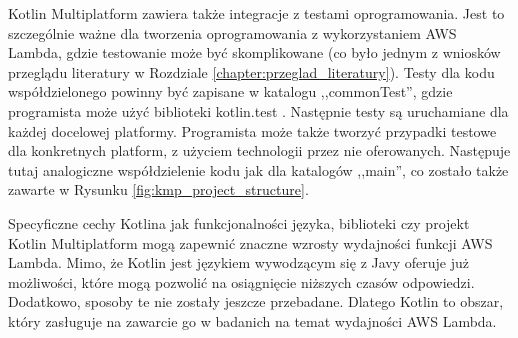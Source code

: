 Kotlin Multiplatform zawiera także integracje z testami oprogramowania.
Jest to szczególnie ważne dla tworzenia oprogramowania z wykorzystaniem AWS Lambda, gdzie testowanie może być skomplikowane (co było jednym z wniosków przeglądu literatury w Rozdziale \ref{chapter:przeglad_literatury}).
Testy dla kodu współdzielonego powinny być zapisane w katalogu ,,commonTest'', gdzie programista może użyć biblioteki kotlin.test \cite{kotlinMultiplatformDev}.
Następnie testy są uruchamiane dla każdej docelowej platformy.
Programista może także tworzyć przypadki testowe dla konkretnych platform, z użyciem technologii przez nie oferowanych.
Następuje tutaj analogiczne współdzielenie kodu jak dla katalogów ,,main'', co zostało także zawarte w Rysunku \ref{fig:kmp_project_structure}.

Specyficzne cechy Kotlina jak funkcjonalności języka, biblioteki czy projekt Kotlin Multiplatform mogą zapewnić znaczne wzrosty wydajności funkcji AWS Lambda.
Mimo, że Kotlin jest językiem wywodzącym się z Javy oferuje już możliwości, które mogą pozwolić na osiągnięcie niższych czasów odpowiedzi.
Dodatkowo, sposoby te nie zostały jeszcze przebadane. 
Dlatego Kotlin to obszar, który zasługuje na zawarcie go w badanich na temat wydajności AWS Lambda.
